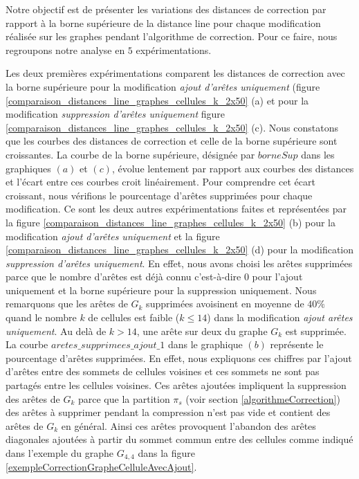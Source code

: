 Notre objectif est de pr\'esenter les variations des distances de correction par rapport \`a la borne sup\'erieure de la distance line pour chaque modification r\'ealis\'ee sur les graphes pendant l'algorithme de correction. Pour ce faire, nous regroupons notre analyse en $5$ exp\'erimentations.
\newline

Les deux premi\`eres exp\'erimentations comparent les distances de correction avec la borne sup\'erieure pour la modification {\em ajout d'ar\^etes uniquement} (figure \ref{comparaison_distances_line_graphes_cellules_k_2x50} (a) et 
pour la modification {\em suppression d'ar\^etes uniquement} figure \ref{comparaison_distances_line_graphes_cellules_k_2x50} (c).
Nous constatons que les courbes des distances de correction et celle de la borne sup\'erieure sont croissantes. 
La courbe de la borne sup\'erieure, d\'esign\'ee par $borneSup$ dans les graphiques $(a)$ et $(c)$, \'evolue lentement par rapport aux courbes des distances et l'\'ecart entre ces courbes croit lin\'eairement. 
Pour comprendre cet \'ecart croissant, nous v\'erifions le pourcentage d'ar\^etes  supprim\'ees pour chaque modification.  Ce sont les deux autres exp\'erimentations faites et repr\'esent\'ees par la figure 
\ref{comparaison_distances_line_graphes_cellules_k_2x50} (b) pour la modification {\em ajout d'ar\^etes uniquement} et
 la figure \ref{comparaison_distances_line_graphes_cellules_k_2x50} (d) pour la modification 
{\em suppression d'ar\^etes uniquement}. 
En effet, nous avons choisi les ar\^etes supprim\'ees parce que le nombre d'ar\^etes est d\'ej\`a connu c'est-\`a-dire $0$ pour l'ajout uniquement et la borne sup\'erieure pour la suppression uniquement. 
\newline
Nous remarquons que les ar\^etes   de $G_k$ supprim\'ees avoisinent en moyenne de
$40\%$ quand le nombre $k$ de cellules est faible ($k \le 14$) dans la modification {\em ajout ar\^etes uniquement}. Au del\`a de $ k > 14 $, une ar\^ete sur deux du graphe $G_{k}$ est supprim\'ee. La courbe  $aretes\_supprimees\_ajout\_1$ dans le graphique $(b)$ repr\'esente le pourcentage d'ar\^etes supprim\'ees.  
En effet, nous expliquons ces chiffres  par l'ajout d'ar\^etes entre des sommets de cellules voisines et ces sommets ne sont pas partag\'es entre les cellules voisines. Ces ar\^etes ajout\'ees impliquent la suppression des ar\^etes de $G_k$ parce que la partition $\pi_s$ (voir section \ref{algorithmeCorrection}) des ar\^etes \`a supprimer pendant la compression n'est pas vide et contient des ar\^etes de $G_k$ en g\'en\'eral. Ainsi ces ar\^etes provoquent l'abandon des ar\^etes diagonales  ajout\'ees \`a partir du sommet commun entre des cellules comme indiqu\'e dans l'exemple du graphe $G_{4,4}$ dans la figure \ref{exempleCorrectionGrapheCelluleAvecAjout}.
